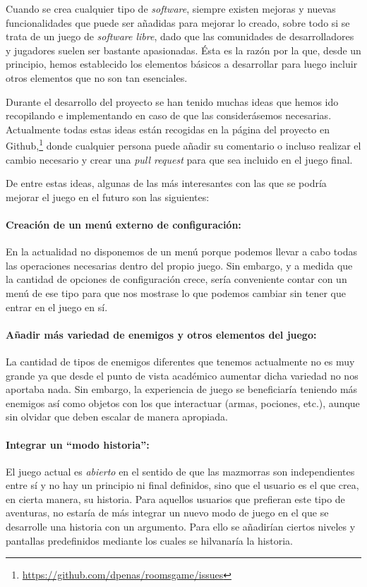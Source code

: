 Cuando se crea cualquier tipo de \textit{software}, siempre existen mejoras y nuevas funcionalidades que puede ser añadidas para mejorar lo creado, sobre todo si se trata de un juego de \textit{software libre}, dado que las comunidades de desarrolladores y jugadores suelen ser bastante apasionadas. Ésta es la razón por la que, desde un principio, hemos establecido los elementos básicos a desarrollar para luego incluir otros elementos que no son tan esenciales.

Durante el desarrollo del proyecto se han tenido muchas ideas que hemos ido recopilando e implementando en caso de que las considerásemos necesarias. Actualmente todas estas ideas están recogidas en la página del proyecto en Github,\footnote{\url{https://github.com/dpenas/roomsgame/issues}} donde cualquier persona puede añadir su comentario o incluso realizar el cambio necesario y crear una \textit{pull request} para que sea incluido en el juego final.

De entre estas ideas, algunas de las más interesantes con las que se podría mejorar el juego en el futuro son las siguientes: 

\paragraph{Creación de un menú externo de configuración:} En la actualidad no disponemos de un menú porque podemos llevar a cabo todas las operaciones necesarias dentro del propio juego. Sin embargo, y a medida que la cantidad de opciones de configuración crece, sería conveniente contar con un menú de ese tipo para que nos mostrase lo que podemos cambiar sin tener que entrar en el juego en sí.

\paragraph{Añadir más variedad de enemigos y otros elementos del juego:} La cantidad de tipos de enemigos diferentes que tenemos actualmente no es muy grande ya que desde el punto de vista académico aumentar dicha variedad no nos aportaba nada. Sin embargo, la experiencia de juego se beneficiaría teniendo más enemigos así como objetos con los que interactuar (armas, pociones, etc.), aunque sin olvidar que deben escalar de manera apropiada.

\paragraph{Integrar un ``modo historia'':} El juego actual es \textit{abierto} en el sentido de que las mazmorras son independientes entre sí y no hay un principio ni final definidos, sino que el usuario es el que crea, en cierta manera, su historia. 
Para aquellos usuarios que prefieran este tipo de aventuras, no estaría de más integrar un nuevo modo de juego en el que se desarrolle una historia con un argumento. Para ello se añadirían ciertos niveles y pantallas predefinidos mediante los cuales se hilvanaría la historia.\cite{Brathwaite_Schreiber_2009_ch13}


